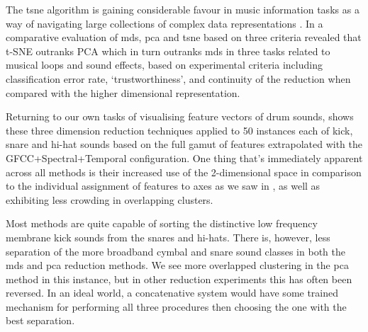 The \acrshort{tsne} algorithm is gaining considerable favour in music information tasks as a way of navigating large collections of complex data representations \citep{Hamel2010, Grill2012, Frisson2014, Frisson2014a, Flexer2015, Martin2017, Font2017}. In a comparative evaluation of \acrshort{mds}, \acrshort{pca} and \acrshort{tsne} based on three criteria \cite{Dupont2013} revealed that t-SNE outranks PCA which in turn outranks \acrshort{mds} in three tasks related to musical loops and sound effects, based on experimental criteria including classification error rate, `trustworthiness', and continuity of the reduction when compared with the higher dimensional representation.

Returning to our own tasks of visualising feature vectors of drum sounds,  shows these three dimension reduction techniques applied to 50 instances each of kick, snare and hi-hat sounds based on the full gamut of features extrapolated with the GFCC+Spectral+Temporal configuration. One thing that's immediately apparent across all methods is their increased use of the 2-dimensional space in comparison to the individual assignment of features to axes as we saw in , as well as exhibiting less crowding in overlapping clusters.

Most methods are quite capable of sorting the distinctive low frequency membrane kick sounds from the snares and hi-hats. There is, however, less separation of the more broadband cymbal and snare sound classes in both the \acrshort{mds} and \acrshort{pca} reduction methods. We see more overlapped clustering in the \acrshort{pca} method in this instance, but in other reduction experiments this has often been reversed. In an ideal world, a concatenative system would have some trained mechanism for performing all three procedures then choosing the one with the best separation.

